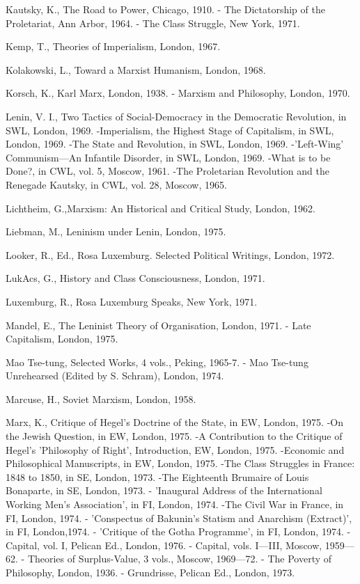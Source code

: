 Kautsky, K., The Road to Power, Chicago, 1910.
- The Dictatorship of the Proletariat, Ann Arbor, 1964.
- The Class Struggle, New York, 1971.

Kemp, T., Theories of Imperialism, London, 1967.

Kolakowski, L., Toward a Marxist Humanism, London, 1968.

Korsch, K., Karl Marx, London, 1938.
- Marxism and Philosophy, London, 1970.

Lenin, V. I., Two Tactics of Social-Democracy in the Democratic Revolution, in SWL, London, 1969.
-Imperialism, the Highest Stage of Capitalism, in SWL, London, 1969.
-The State and Revolution, in SWL, London, 1969.
-'Left-Wing' Communism—An Infantile Disorder, in SWL, London, 1969.
-What is to be Done?, in CWL, vol. 5, Moscow, 1961.
-The Proletarian Revolution and the Renegade Kautsky, in CWL, vol. 28, Moscow, 1965.

Lichtheim, G.,Marxism: An Historical and Critical Study, London, 1962.

Liebman, M., Leninism under Lenin, London, 1975.

Looker, R., Ed., Rosa Luxemburg. Selected Political Writings, London, 1972.

LukAcs, G., History and Class Consciousness, London, 1971.

Luxemburg, R., Rosa Luxemburg Speaks, New York, 1971.

Mandel, E., The Leninist Theory of Organisation, London, 1971.
- Late Capitalism, London, 1975.

Mao Tse-tung, Selected Works, 4 vols., Peking, 1965-7.
- Mao Tse-tung Unrehearsed (Edited by S. Schram), London, 1974.

Marcuse, H., Soviet Marxism, London, 1958.

Marx, K., Critique of Hegel's Doctrine of the State, in EW, London, 1975.
-On the Jewish Question, in EW, London, 1975.
-A Contribution to the Critique of Hegel's 'Philosophy of Right', Introduction, EW, London, 1975.
-Economic and Philosophical Manuscripts, in EW, London, 1975.
-The Class Struggles in France: 1848 to 1850, in SE, London, 1973.
-The Eighteenth Brumaire of Louis Bonaparte, in SE, London, 1973.
- 'Inaugural Address of the International Working Men's Association', in FI, London, 1974.
-The Civil War in France, in FI, London, 1974.
- 'Conspectus of Bakunin's Statism and Anarchism (Extract)', in FI, London,1974.
- 'Critique of the Gotha Programme', in FI, London, 1974.
- Capital, vol. I, Pelican Ed., London, 1976.
- Capital, vols. I—III, Moscow, 1959—62.
- Theories of Surplus-Value, 3 vols., Moscow, 1969—72.
- The Poverty of Philosophy, London, 1936.
- Grundrisse, Pelican Ed., London, 1973.

